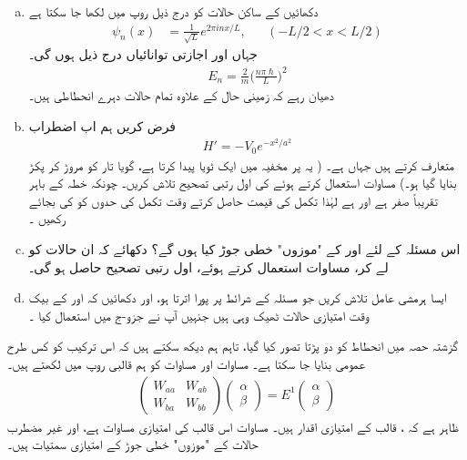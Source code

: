 \begin{enumerate}[a.]
\item
دکھائیں کے ساکن حالات کو درج ذیل روپ میں لکھا جا سکتا ہے 
 \begin{align*}
\psi_n (x) &= \frac{1}{\sqrt{L}} e^{2 \pi i n x/ L}, &&(-L/2 < x < L/2)
\end{align*}
جہاں  اور اجازتی توانائیاں درج ذیل ہوں گی۔
\begin{align*}
E_n = \frac{2}{m} \big ( \frac{n \pi \hslash}{L} \big )^2
\end{align*}
دھیان رہے کہ زمینی حال  کے علاوہ تمام حالات دہرے  انحطاطی ہیں۔ 
\item
فرض کریں ہم اب اضطراب 
\begin{align*}
H' = -V_0 e^{-x^2 / a^2}
\end{align*}
متعارف کرتے ہیں جہاں  ہے۔ ( یہ  پر مخفیہ میں ایک ٹویا  پیدا کرتا ہے، گویا    تار کو مروڑ   کر پکڑ بنایا  گیا ہو۔) مساوات   استعمال کرتے ہوئے  کی اول رتبی  تصحیح  تلاش کریں۔  چونکہ  خطہ  کے باہر تقریباً  صفر ہے اور  ہے لہٰذا تکمل کی قیمت حاصل کرتے وقت تکمل کی حدوں کو  کی بجائے   رکھیں ۔
\item
اس مسئلہ کے لئے  اور  کے "موزوں" خطی جوڑ کیا ہوں گے؟  دکھائے کہ ان حالات کو لے کر،  مساوات   استعمال کرتے ہوئے،  اول رتبی  تصحیح  حاصل ہو گی۔ 
\item
ایسا ہرمشی عامل  تلاش کریں جو مسئلہ کے شرائط پر پورا اترتا ہو، اور   دکھائیں کہ  اور  کے بیک وقت امتیازی حالات ٹھیک وہی ہیں   جنہیں  آپ نے جزو-ج میں استعمال کیا ۔
\end{enumerate}


گزشتہ حصہ میں انحطاط کو دو پڑتا تصور کیا گیا،  تاہم ہم دیکھ سکتے ہیں کہ اس ترکیب کو کس طرح عمومی بنایا جا سکتا ہے۔ مساوات    اور  مساوات   کو ہم   قالبی  روپ میں لکھتے ہیں۔ 
\begin{align}
\begin{pmatrix} 
W_{aa} & W_{ab} \\
W_{ba} & W_{bb}
\end{pmatrix}
\begin{pmatrix}
\alpha \\
\beta
\end{pmatrix}
= E^1
\begin{pmatrix}
\alpha \\
\beta
\end{pmatrix}
\end{align}
ظاہر ہے کہ  ،  قالب کے امتیازی اقدار ہیں۔ مساوات    اس قالب کی امتیازی مساوات ہے،   اور غیر مضطرب حالات کے "موزوں" خطی جوڑ  کے امتیازی سمتیات ہیں۔

